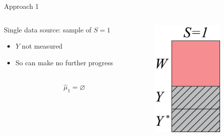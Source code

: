\documentclass{beamer}
\begin{document}
\begin{frame}{Approach 1}
	\begin{minipage}[0.2\textheight]{\textwidth}
		\begin{columns}[T]
			\begin{column}{0.6\textwidth}
				Single data source: sample of $S=1$
				\begin{itemize}
					\item $Y$ not measured
					\item So can make no further progress
				\end{itemize}~\\
				\[\hat{\mu}_1 = \varnothing\]
			\end{column}
			\begin{column}{0.35\textwidth}
				\includegraphics[width=3.5cm]{images/data_sources1.png}
			\end{column}
		\end{columns}
	\end{minipage}	
\end{frame}
\end{document}
